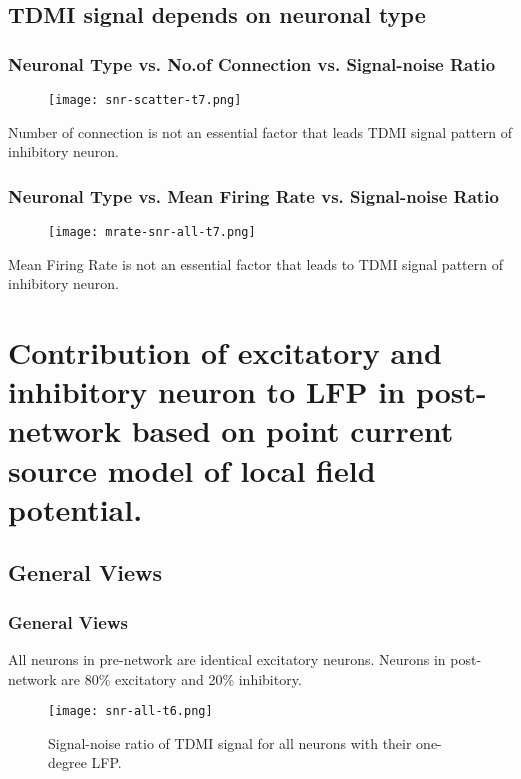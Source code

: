\documentclass{beamer}
\begin{document}
	\subsection{TDMI signal depends on neuronal type}
	\begin{frame}
	\frametitle{Neuronal Type vs. No.of Connection vs. Signal-noise Ratio}
		\begin{figure}[h]
			\centering
			\texttt{[image: snr-scatter-t7.png]}
			\label{fig:type_snr_all}
		\end{figure}
		\footnotesize{Number of connection is not an essential factor that leads TDMI signal pattern of inhibitory neuron.}
	\end{frame}

	\begin{frame}
	\frametitle{Neuronal Type vs. Mean Firing Rate vs. Signal-noise Ratio}
		\begin{figure}[h]
			\centering
			\texttt{[image: mrate-snr-all-t7.png]}
			\label{fig:mrate_snr_2}
		\end{figure}
		\footnotesize{Mean Firing Rate is not an essential factor that leads to TDMI signal pattern of inhibitory neuron.}
	\end{frame}



	\section{Contribution of excitatory and inhibitory neuron to LFP in post-network based on point current source model of local field potential.}
	\subsection{General Views}
	\begin{frame}
	\frametitle{General Views}
		\footnotesize{All neurons in pre-network are identical excitatory neurons. Neurons in post-network are 80\% excitatory and 20\% inhibitory. } 
		\begin{figure}
			\centering
			\texttt{[image: snr-all-t6.png]}
			\caption{\footnotesize{Signal-noise ratio of TDMI signal for all neurons with their one-degree LFP.}}
			\label{fig:snr_all_2}
		\end{figure}
	\end{frame}
\end{document}
